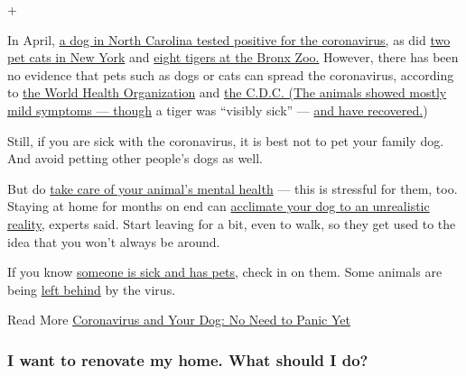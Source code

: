+

In April,
\href{https://www.nytimes3xbfgragh.onion/2020/04/28/us/dog-coronavirus-positive-test.html}{a
dog in North Carolina tested positive for the coronavirus,} as did
\href{https://www.nytimes3xbfgragh.onion/2020/04/22/health/cats-pets-coronavirus.html}{two
pet cats in New York} and
\href{https://newsroom.wcs.org/News-Releases/articleType/ArticleView/articleId/14084/Update-Bronx-Zoo-Tigers-and-Lions-Recovering-from-COVID-19.aspx}{eight
tigers at the Bronx Zoo.} However, there has been no evidence that pets
such as dogs or cats can spread the coronavirus, according to
\href{https://www.who.int/docs/default-source/inaugural-who-partners-forum/coronavirus-poster-english-srilanka.pdf?sfvrsn=289dedc3_0}{the
World Health Organization} and
\href{https://www.cdc.gov/coronavirus/2019-ncov/daily-life-coping/animals.html?CDC_AA_refVal=https\%3A\%2F\%2Fwww.cdc.gov\%2Fcoronavirus\%2F2019-ncov\%2Fprepare\%2Fanimals.html}{the
C.D.C. (The animals showed mostly mild symptoms --- though} a tiger was
``visibly sick'' ---
\href{https://www.cdc.gov/coronavirus/2019-ncov/daily-life-coping/animals.html?CDC_AA_refVal=https\%3A\%2F\%2Fwww.cdc.gov\%2Fcoronavirus\%2F2019-ncov\%2Fprepare\%2Fanimals.html}{and
have recovered.})

Still, if you are sick with the coronavirus, it is best not to pet your
family dog. And avoid petting other people's dogs as well.

But do
\href{https://www.nytimes3xbfgragh.onion/2020/04/21/well/coronavirus-pet-care-grooming.html}{take
care of your animal's mental health} --- this is stressful for them,
too. Staying at home for months on end can
\href{https://www.nytimes3xbfgragh.onion/2020/05/27/smarter-living/how-to-prepare-your-dog-to-be-left-at-home-alone-again.html}{acclimate
your dog to an unrealistic reality,} experts said. Start leaving for a
bit, even to walk, so they get used to the idea that you won't always be
around.

If you know
\href{https://www.nytimes3xbfgragh.onion/2020/04/19/world/europe/coronavirus-spain-pets.html}{someone
is sick and has pets,} check in on them. Some animals are being
\href{https://www.nytimes3xbfgragh.onion/2020/06/23/nyregion/coronavirus-pets.html}{left
behind} by the virus.

Read More
\href{https://www.nytimes3xbfgragh.onion/2020/03/04/science/animals-pets-coronavirus.html}{Coronavirus
and Your Dog: No Need to Panic Yet}

\hypertarget{i-want-to-renovate-my-home-what-should-i-do}{%
\subsubsection{I want to renovate my home. What should I
do?}\label{i-want-to-renovate-my-home-what-should-i-do}}

